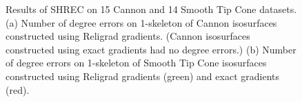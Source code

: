 \begin{figure}[t]

\caption{Results of SHREC on 15 Cannon and 14 Smooth Tip Cone datasets.
(a) Number of degree errors on 1-skeleton of Cannon isosurfaces
constructed using Religrad gradients.
(Cannon isosurfaces constructed using exact gradients had no degree errors.)
(b) Number of degree errors on 1-skeleton of Smooth Tip Cone isosurfaces
constructed using Religrad gradients (green) and exact gradients (red).}
\label{fig:cannon_cone_summary}
\end{figure}

